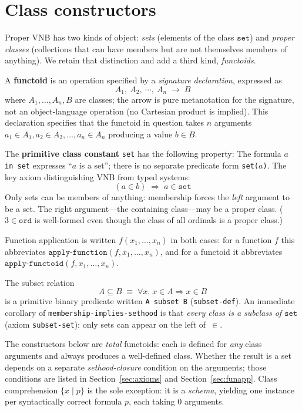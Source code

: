 \section{Class constructors}
\label{sec:class-set-discipline}

Proper VNB has two kinds of object: \emph{sets} (elements of
the class $\mathtt{set}$) and \emph{proper classes} (collections that can have
members but are not themselves members of anything).  We retain that
distinction and add a third kind, \emph{functoids}.

A \textbf{functoid} is an operation specified by a \emph{signature declaration},
expressed as
\[
  A_1, \ A_2, \ \cdots, \ A_n \;\to\; B
\]
where $A_1, \ldots, A_n, B$ are classes; the arrow is pure metanotation
for the signature, not an object-language operation (no Cartesian
product is implied).  This declaration specifies that the functoid in
question takes $n$ arguments $a_1 \in A_1, a_2 \in A_2, \ldots, a_n
\in A_n$ producing a value $b \in B$.



The \textbf{primitive class constant} \texttt{set} has the following
property: The formula \texttt{$a$ in set} expresses ``$a$ is a set'';
there is no separate predicate form \texttt{set($a$)}.  The key axiom
distinguishing VNB from typed systems: \[
  (a \in b) \;\Longrightarrow\; a \in \mathtt{set}
\]
Only sets can be members of anything: membership forces the \emph{left}
argument to be a set.  The right argument---the containing class---may be
a proper class.  ($3 \in \mathtt{ord}$ is well-formed even though the
class of all ordinals is a proper class.)

Function application is written $f(x_1, \ldots, x_n)$ in both cases:
for a function $f$ this abbreviates $\texttt{apply-function}(f, x_1, \ldots, x_n)$,
and for a functoid it abbreviates $\texttt{apply-functoid}(f, x_1, \ldots, x_n)$.

The subset relation
\[
  A \subseteq B \;\equiv\; \forall x.\; x \in A \Rightarrow x \in B
\]
is a primitive binary predicate written \texttt{A subset B}
(\texttt{subset-def}).  An immediate corollary of
\texttt{membership-implies-sethood} is that \emph{every class is a
subclass of $\mathtt{set}$} (axiom \texttt{subset-set}): only sets can
appear on the left of~$\in$.

The constructors below are \emph{total} functoids: each is defined for
\emph{any} class arguments and always produces a well-defined class.
Whether the result is a set depends on a separate \emph{sethood-closure}
condition on the arguments; those conditions are listed in
Section~\ref{sec:axioms} and Section~\ref{sec:funapp}.
Class comprehension $\{x \mid p\}$ is the sole exception: it is a
\emph{schema}, yielding one instance per syntactically correct formula
$p$, each taking $0$ arguments.

